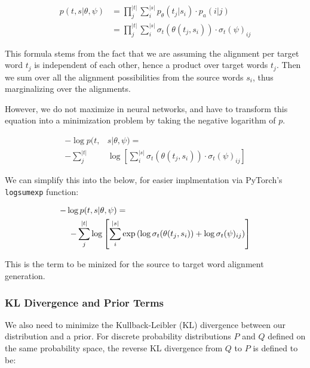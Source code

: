 \documentclass[twoside,twocolumn]{article}
\begin{document}
\begin{equation}
  \begin{split}
  p(t, s | \theta, \psi) &= \prod_j^{|t|} \sum_i^{|s|} p_\theta(t_j| s_i) \cdot p_a(i|j) \\
  &= \prod_j^{|t|} \sum_i^{|s|} \sigma_t(\theta(t_j, s_i)) \cdot \sigma_t(\psi)_{ij}
  \end{split}
\end{equation}

This formula stems from the fact that we are assuming the alignment per target word $t_j$ is independent of each other, hence a product over target words $t_j$. Then we sum over all the alignment possibilities from the source words $s_i$, thus marginalizing over the alignments.

However, we do not maximize in neural networks, and have to transform this equation into a minimization problem by taking the negative logarithm of $p$.

\begin{equation}
  \begin{split}
  -\log p(t, & s | \theta, \psi) = \\
  - \sum_j^{|t|} & \log \left[ \sum_i^{|s|} \sigma_t \left( \theta(t_j, s_i) \right) \cdot \sigma_t(\psi)_{ij} \right]
\end{split}
\end{equation}

We can simplify this into the below, for easier implmentation via PyTorch's \texttt{logsumexp} function:

\begin{equation}
  \centering
  \begin{split}
  -\log  p(t & , s | \theta, \psi) = \\
  - \sum_j^{|t|} & \log \left[ \sum_i^{|s|} \exp \left( \log \sigma_t(\theta(t_j, s_i)) + \log \sigma_t(\psi)_{ij} \right) \right]
\end{split}
\end{equation}

This is the term to be minized for the source to target word alignment generation.

\subsubsection{KL Divergence and Prior Terms}

We also need to minimize the Kullback-Leibler (KL) divergence between our distribution and a prior. For discrete probability distributions $P$ and $Q$ defined on the same probability space, the reverse KL divergence from $Q$ to $P$ is defined to be:
\end{document}
